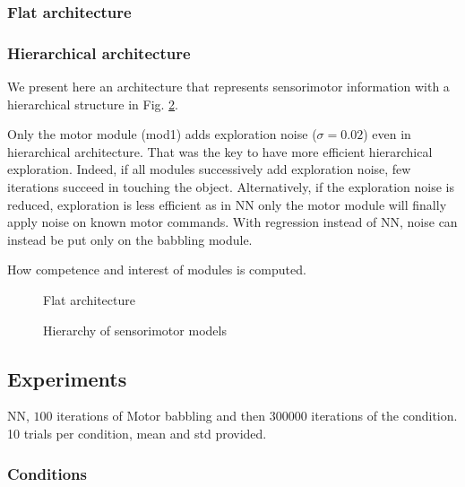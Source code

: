 \documentclass[10pt,letterpaper]{article}
\begin{document}
				
		
		\subsubsection{Flat architecture}
			
				
		
		\subsubsection{Hierarchical architecture}
			
			We present here an architecture that represents sensorimotor information with a hierarchical structure in Fig. \ref{H1}.
			
			Only the motor module (mod1) adds exploration noise ($\sigma=0.02$) even in hierarchical architecture. 
			That was the key to have more efficient hierarchical exploration. 
			Indeed, if all modules successively add exploration noise, few iterations succeed in touching the object. 
			Alternatively, if the exploration noise is reduced, exploration is less efficient as in NN only the motor module will finally apply noise on known motor commands. 
			With regression instead of NN, noise can instead be put only on the babbling module.
			
			How competence and interest of modules is computed.
			
			\begin{figure}[t]
				\center
				
				\caption{Flat architecture}
				\label{F}					
			\end{figure}
			
			\begin{figure}[t]
				\center
				
				\caption{Hierarchy of sensorimotor models}
				\label{H1}					
			\end{figure}

				
		

	
	\subsection{Experiments}
		
		NN, $100$ iterations of Motor babbling and then $300000$ iterations of the condition. 10 trials per condition, mean and std provided.
		
		
		\subsubsection{Conditions}
			
\end{document}
